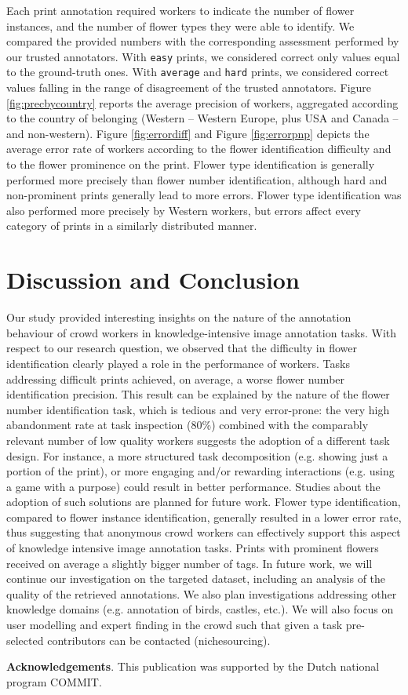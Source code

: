 \documentclass{sig-alternate-2013}
\begin{document}
Each print annotation required workers to indicate the number of flower instances, and the number of flower types they were able to identify. We compared the provided numbers with the corresponding assessment performed by our trusted annotators. With \texttt{easy} prints, we considered correct only values equal to the ground-truth ones. With \texttt{average} and \texttt{hard} prints, we considered correct values falling in the range of disagreement of the trusted annotators. Figure \ref{fig:precbycountry} reports the average precision of workers, aggregated according to the country of belonging (Western --  Western Europe, plus USA and Canada -- and non-western). Figure \ref{fig:errordiff} and Figure \ref{fig:errorpnp} depicts the average error rate of workers according to the flower identification difficulty and to the flower prominence on the print. Flower type identification is generally performed more precisely than flower number identification, although hard and non-prominent prints generally lead to more errors. Flower type identification was also performed more precisely by Western workers, but errors affect every category of prints in a similarly distributed manner.

\section{Discussion and Conclusion}

Our study provided interesting insights on the nature of the annotation behaviour of crowd workers in knowledge-intensive image annotation tasks. With respect to our research question, we observed that the difficulty in flower identification clearly played a role in the performance of workers. Tasks addressing difficult prints achieved, on average, a worse flower number identification precision. This result can be explained by the nature of the flower number identification task, which is tedious and very error-prone: the very high abandonment rate at task inspection (80\%) combined with the comparably relevant number of low quality workers suggests the adoption of a different task design. For instance, a more structured task decomposition (e.g. showing just a portion of the print), or more engaging and/or rewarding interactions (e.g. using a game with a purpose) could result in better performance. Studies about the adoption of such solutions are planned for future work. Flower type identification, compared to flower instance identification, generally resulted in a lower error rate, thus suggesting that anonymous crowd workers can effectively support this aspect of knowledge intensive image annotation tasks. Prints with prominent flowers received on average a slightly bigger number of tags. In future work, we will continue our investigation on the targeted dataset, including an analysis of the quality of the retrieved annotations. We also plan investigations addressing other knowledge domains  (e.g. annotation of birds, castles, etc.). We will also focus on user modelling and expert finding \cite{bozzon2013} in the crowd such that given a task pre-selected contributors can be contacted (nichesourcing)\cite{Boer2012}.

\vspace{5px}
\noindent\textbf{Acknowledgements}. This publication was supported by the Dutch national program COMMIT.
%

 
\balancecolumns
\end{document}
